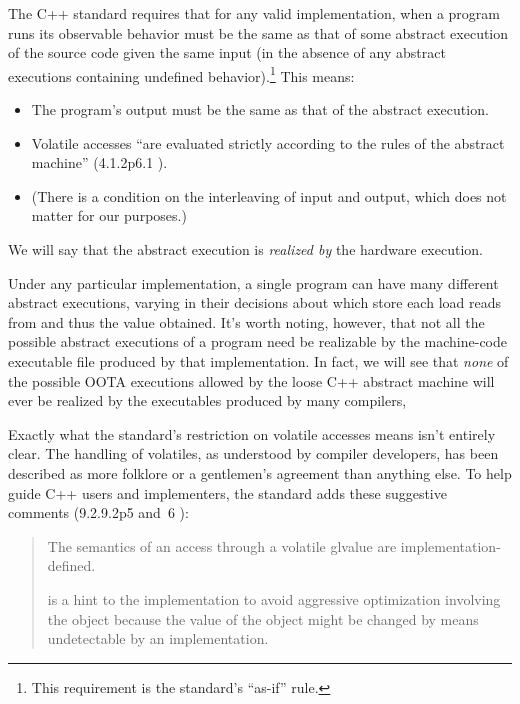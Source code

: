 \documentclass[10]{article}
\begin{document}
The C++ standard requires that for any valid implementation, when a
program runs its observable behavior must be the same as that of some
abstract execution of the source code given the same input (in the
absence of any abstract executions containing undefined behavior).\footnote{
	This requirement is the standard's ``as-if'' rule.}
This means:
\begin{itemize}
\item	The program's output must be the same as that of the abstract
	execution.
\item	Volatile accesses ``are evaluated strictly according to the
	rules of the abstract machine'' (4.1.2p6.1 ).
\item	(There is a condition on the interleaving of input and output,
	which does not matter for our purposes.)
\end{itemize}
We will say that the abstract execution is \emph{realized by} the
hardware execution.

Under any particular implementation,
a single program can have many different abstract executions,
varying in their decisions about which store each load reads from
and thus the value obtained.
It's worth noting, however, that not all the possible abstract executions
of a program need be realizable by the machine-code executable file
produced by that implementation.
In fact, we will see that \emph{none} of the possible OOTA executions
allowed by the loose C++ abstract machine will ever be realized
by the executables produced by many compilers,

Exactly what the standard's restriction on volatile accesses means
isn't entirely clear.
The handling of volatiles, as understood by compiler developers, has
been described as more folklore or a gentlemen's agreement than
anything else.
To help guide C++ users and implementers, the standard adds these
suggestive comments (9.2.9.2p5 and~6 ):
\begin{quote}
	The semantics of an access through a volatile glvalue are
	implementation-defined.

	 is a hint to the implementation to avoid aggressive
	optimization involving the object because the value of the object
	might be changed by means undetectable by an implementation.
\end{quote}
\end{document}
